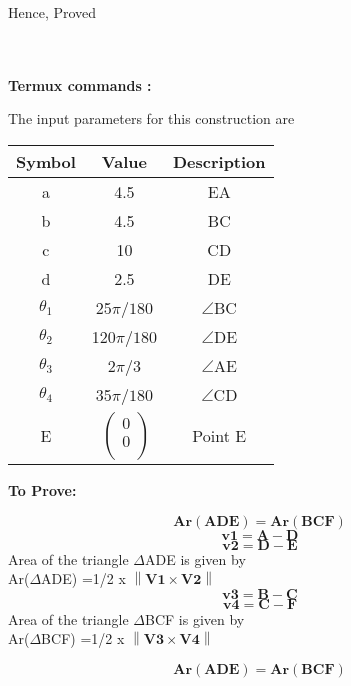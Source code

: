 \documentclass[10pt,a4paper]{report}
\providecommand{\norm}[1]{\left\lVert#1\right\rVert}
\let\vec\mathbf
\let\vec\mathbf
\begin{document}
\begin{multicols}{2}
\begin{center}
Hence, Proved \\
\
\\
\
\\
\end{center}
\vspace{3mm}
\textbf{Termux commands :}


The input parameters for this construction are 
\begin{center}
\begin{tabular}{|c|c|c|}
	\hline
	\textbf{Symbol}&\textbf{Value}&\textbf{Description}\\
	\hline
	a&4.5&EA\\
	\hline
	b&4.5&BC\\
	\hline
	c&10&CD\\
	\hline
	d&2.5&DE\\
	\hline
	${\theta}_1$& 25$\pi/180$&$ \angle $BC\\ 
	\hline
	${\theta}_2$& 120$\pi/180$&$ \angle $DE\\ 
	\hline
	${\theta}_3$& 2$\pi/3$&$ \angle $AE\\ 
	\hline
	${\theta}_4$& 35$\pi/180$&$ \angle $CD\\ 
    \hline
	E&$\
	\begin{pmatrix}
		0 \\
		0 \\
	\end{pmatrix}$%
	&Point E\\
	\hline
\end{tabular}
\end{center}

\textbf{To Prove:} 
  \begin{center}
  \begin{equation}
      \vec{Ar(ADE)=Ar(BCF)}
  \end{equation}
  \begin{equation}
      \vec{v1=A-D}
      \end{equation}
      \begin{equation}
      \vec{v2=D-E}
 \end{equation}
 \vspace{3mm}
 Area of the triangle $\Delta$ADE is given by \\
 Ar($\Delta$ADE)
=1/2 x $\norm{\vec{V1}\times\vec{V2}}$
 \begin{equation}
      \vec{v3=B-C}
 \end{equation}
 \begin{equation}
    \vec{v4=C-F} 
 \end{equation}
 \vspace{3mm}
  Area of the triangle $\Delta$BCF is given by \\
  Ar($\Delta$BCF)
  =1/2 x $\norm{\vec{V3}\times\vec{V4}}$
 \end{center}
 \begin{center}
\begin{equation}
    \vec{Ar(ADE)=Ar(BCF)}
\end{equation}
\end{center}

\end{multicols}
\end{document}
